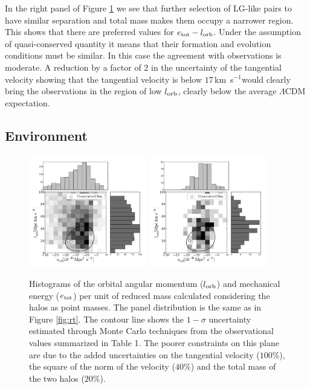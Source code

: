 \documentclass{emulateapj}
\newcommand{\kms}{\,km~s$^{-1}$}
\begin{document}
In the right panel of Figure \ref{fig:EJ} we see that further selection of LG-like pairs to have similar separation and total mass makes them occupy a narrower region. This shows that there are preferred values for $e_{\rm tot}-l_{\rm orb}$. Under the assumption of quasi-conserved quantity it means that their formation and evolution conditions must be similar. In this case the agreement with observations is moderate. A reduction by a factor of $2$ in the uncertainty of the tangential velocity showing that the tangential velocity is below $17$\kms would clearly bring the observations in the region of low $l_{\rm orb}$, clearly below the average $\Lambda$CDM expectation.








\subsection{Environment}


\begin{figure}
\begin{center}
\includegraphics[keepaspectratio=true,width=0.46\textwidth]{./figures/test_EJ.pdf}
\includegraphics[keepaspectratio=true,width=0.46\textwidth]{./figures/test_EJ_narrow.pdf}
\caption{Histograms of the orbital angular momentum ($l_{\rm orb}$) and mechanical energy ($e_{\rm tot}$) per unit of reduced mass calculated considering the halos as point masses. The panel distribution is the same as in Figure \ref{fig:rt}. The contour line shows the $1-\sigma$ uncertainty estimated through Monte Carlo techniques from the observational values summarized in Table 1. The poorer constraints on this plane are due to the added uncertainties on the tangential velocity ($100\%$), the square of the norm of the velocity ($40\%$) and the total mass of the two halos ($20\%$). }
\label{fig:EJ}
\end{center}
\end{figure}
\end{document}
